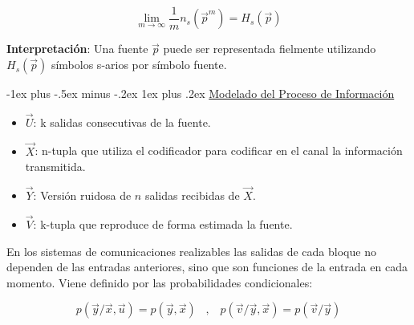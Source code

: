 \documentclass[10pt,landscape]{article}
\makeatletter
\renewcommand{\subsubsection}{\@startsection{subsubsection}{3}{0mm}%
                                {-1ex plus -.5ex minus -.2ex}%
                                {1ex plus .2ex}%
                                {\normalfont\small\bfseries}}
\makeatother
\begin{document}
\begin{multicols}{3}
\begin{equation*}
	\lim_{m \rightarrow \infty} \frac{1}{m} n_s (\vec{p}^m) = H_s(\vec{p})
\end{equation*}

\textbf{Interpretación}: Una fuente $\vec{p}$ puede ser representada fielmente utilizando $H_s(\vec{p})$ símbolos s-arios por símbolo fuente. 

\subsubsection{\underline{Modelado del Proceso de Información}}

\begin{center}
\end{center}


\begin{itemize}
	\item $\vec{U}$: k salidas consecutivas de la fuente.
	\item $\vec{X}$: n-tupla que utiliza el codificador para codificar en el canal la información transmitida.
	\item $\vec{Y}$: Versión ruidosa de $n$ salidas recibidas de $\vec{X}$.
	\item $\vec{V}$: k-tupla que reproduce de forma estimada la fuente.
\end{itemize}

En los sistemas de comunicaciones realizables las salidas de cada bloque no dependen de las entradas anteriores, sino que son funciones de la entrada en cada momento. Viene definido por las probabilidades condicionales:

	\begin{equation*}
		p(\vec{y}/\vec{x}, \vec{u}) = p(\vec{y}, \vec{x}) \hspace{10pt} , \hspace{10pt} p(\vec{v}/\vec{y}, \vec{x}) = p(\vec{v}/\vec{y})
	\end{equation*}


\end{multicols}
\end{document}
